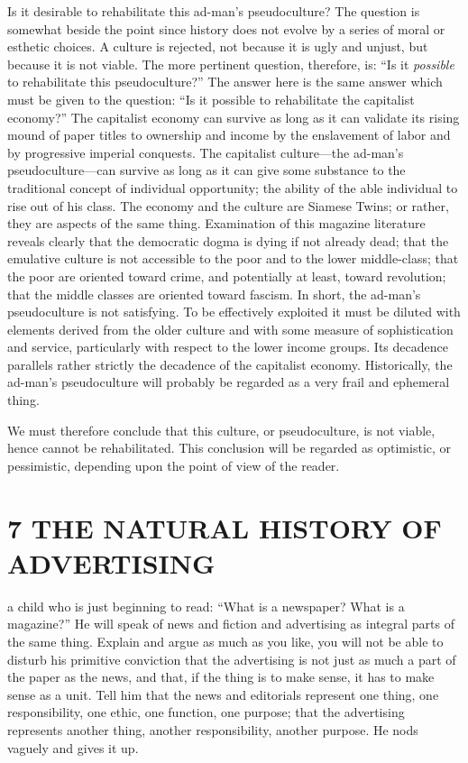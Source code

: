 \documentclass[twoside,nohyper,openany,nobib]{tufte-book}
\let\oldchapter\chapter
\def\chapter{%
  \setcounter{footnote}{0}%
  \oldchapter
}
\begin{document}
Is it desirable to rehabilitate this ad-man's pseudoculture? The
question is somewhat beside the point since history does not evolve by a
series of moral or esthetic choices. A culture is rejected, not because
it is ugly and unjust, but because it is not viable. The more pertinent
question, therefore, is: ``Is it \emph{possible} to rehabilitate this
pseudoculture?'' The answer here is the same answer which must be given
to the question: ``Is it possible to rehabilitate the capitalist
economy?'' The capitalist economy can survive as long as it can validate
its rising mound of paper titles to ownership and income by the
enslavement of labor and by progressive imperial conquests. The
capitalist culture---the ad-man's pseudoculture---can survive as long as
it can give some substance to the traditional concept of individual
opportunity; the ability of the able individual to rise out of his
class. The economy and the culture are Siamese Twins; or rather, they
are aspects of the same thing. Examination of this magazine literature
reveals clearly that the democratic dogma is dying if not already dead;
that the emulative culture is not accessible to the poor and to the
lower middle-class; that the poor are oriented toward crime, and
potentially at least, toward revolution; that the middle classes are
oriented toward fascism. In short, the ad-man's pseudoculture is not
satisfying. To be effectively exploited it must be diluted with elements
derived from the older culture and with some measure of sophistication
and service, particularly with respect to the lower income groups. Its
decadence parallels rather strictly the decadence of the capitalist
economy. Historically, the ad-man's pseudoculture will probably be
regarded as a very frail and ephemeral thing.

We must therefore conclude that this culture, or pseudoculture, is not
viable, hence cannot be rehabilitated. This conclusion will be regarded
as optimistic, or pessimistic, depending upon the point of view of the
reader.



\chapter[7 \hspace*{1mm} THE NATURAL HISTORY OF ADVERTISING]{7 THE NATURAL HISTORY OF ADVERTISING}

  a child who is just beginning to read: ``What is a newspaper? What
is a magazine?'' He will speak of news and fiction and advertising as
integral parts of the same thing. Explain and argue as much as you like,
you will not be able to disturb his primitive conviction that the
advertising is not just as much a part of the paper as the news, and
that, if the thing is to make sense, it has to make sense as a unit.
Tell him that the news and editorials represent one thing, one
responsibility, one ethic, one function, one purpose; that the
advertising represents another thing, another responsibility, another
purpose. He nods vaguely and gives it up.
\end{document}

